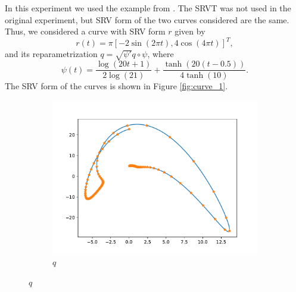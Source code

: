 In this experiment we used the example from \cite[Section 4.2.6]{jørgen2021}. The SRVT was not used in the original experiment, but SRV form of the two curves considered are the same. Thus, we considered a curve with SRV form \(r\) given by 
\begin{equation*}
    r(t) = \pi [-2 \sin(2\pi t), 4\cos(4\pi t)]^T,
\end{equation*}
and its reparametrization \(q = \sqrt{\psi'}q \circ \psi\), where 
\begin{equation*}
    \psi(t) = \frac{\log(20t + 1)}{2 \log(21)} + \frac{\tanh(20(t - 0.5))}{4 \tanh(10)}.
\end{equation*}
The SRV form of the curves is shown in Figure \ref{fig:curve_1}. 

\begin{figure}[b]
    \begin{subfigure}[t]{0.5\textwidth}
        \centering
        \includegraphics[width=\linewidth]{figures/curve_1/curve_q.pdf}
        \caption{\(q\)}\label{fig:curve_1_q}
    \end{subfigure}

\end{figure}
